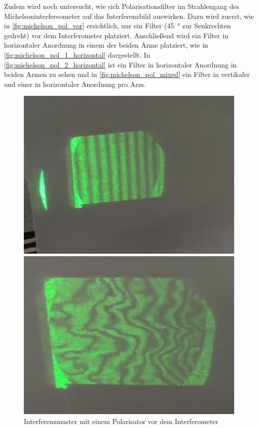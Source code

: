 \documentclass[ngerman]{scrartcl}
\begin{document}
Zudem wird noch untersucht, wie sich Polarisationsfilter im Strahlengang des Michelsoninterfereometer auf das Interferenzbild auswirken.
Dazu wird zuerst, wie in \autoref{fig:michelson_pol_vor} ersichtlich, nur ein Filter (\SI{45}{\degree} zur Senkrechten gedreht) vor dem Interferometer platziert. Anschließend wird ein Filter in horizontaler Anordnung in einem der beiden Arme platziert, wie in \autoref{fig:michelson_pol_1_horizontal} dargestellt. In \autoref{fig:michelson_pol_2_horizontal} ist ein Filter in horizontaler Anordnung in beiden Armen zu sehen und in \autoref{fig:michelson_pol_mixed} ein Filter in vertikaler und einer in horizontaler Anordnung pro Arm.
%
\setcapindent{0pt}
\begin{figure}[H]
    \centering
    \begin{minipage}[t]{0.45\linewidth}
        \centering
        \includegraphics[width=\linewidth]{fig/Compressed/Out_horizontal_detail.jpg} %
        \caption[Interferenzmuster Polarisator davor]{Interferenzmuster mit einem Polarisator vor dem Interferometer}
        \label{fig:michelson_pol_vor}
        \includegraphics[width=\linewidth]{fig/Compressed/Arago_2_Horizontal_detail.jpg}

\end{minipage}
\end{figure}
\end{document}
